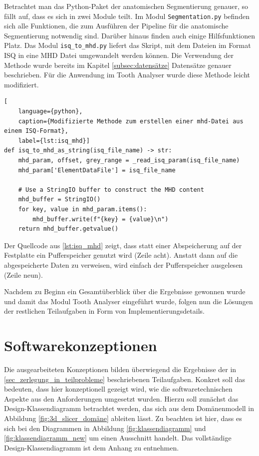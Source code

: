 Betrachtet man das Python-Paket der anatomischen Segmentierung genauer, so fällt
auf, dass es sich in zwei Module teilt. Im Modul \texttt{Segmentation.py}
befinden sich alle Funktionen, die zum Ausführen der Pipeline für die anatomische
Segmentierung notwendig sind. Darüber hinaus finden auch einige Hilfsfunktionen
Platz. Das Modul \texttt{isq\_to\_mhd.py} liefert das Skript, mit dem Dateien im
Format \ac{ISQ} in eine \ac{MHD} Datei umgewandelt werden können. Die Verwendung
der Methode wurde bereits im Kapitel \ref{subsec:datensätze} Datensätze genauer
beschrieben. Für die Anwendung im Tooth Analyser wurde diese Methode leicht modifiziert.

\begin{lstlisting}[
    language={python},
    caption={Modifizierte Methode zum erstellen einer mhd-Datei aus einem ISQ-Format},
    label={lst:isq_mhd}]
def isq_to_mhd_as_string(isq_file_name) -> str:
    mhd_param, offset, grey_range = _read_isq_param(isq_file_name)
    mhd_param['ElementDataFile'] = isq_file_name

    # Use a StringIO buffer to construct the MHD content
    mhd_buffer = StringIO()
    for key, value in mhd_param.items():
        mhd_buffer.write(f"{key} = {value}\n")
    return mhd_buffer.getvalue()
\end{lstlisting}

Der Quellcode aus \ref{lst:isq_mhd} zeigt, dass statt einer Abspeicherung auf der
Festplatte ein Pufferspeicher genutzt wird (Zeile acht). Anstatt dann auf die
abgespeicherte Daten zu verweisen, wird einfach der Pufferspeicher ausgelesen (Zeile
neun).

Nachdem zu Beginn ein Gesamtüberblick über die Ergebnisse gewonnen wurde und damit
das Modul Tooth Analyser eingeführt wurde, folgen nun die Lösungen der
restlichen Teilaufgaben in Form von Implementierungsdetails.

\pagebreak

\section{Softwarekonzeptionen}
\label{sec:konzeptionen} Die ausgearbeiteten Konzeptionen bilden überwiegend die
Ergebnisse der in \ref{sec_zerlegung_in_teilprobleme} beschriebenen Teilaufgaben.
Konkret soll das bedeuten, dass hier konzeptionell gezeigt wird, wie die
softwaretechnischen Aspekte aus den Anforderungen umgesetzt wurden. Hierzu soll zunächst
das Design-Klassendiagramm betrachtet werden, das sich aus dem Domänenmodell in
Abbildung \ref{fig:3d_slicer_domäne} ableiten lässt. Zu beachten ist hier, dass
es sich bei den Diagrammen in Abbildung \ref{fig:klassendiagramm} und
\ref{fig:klassendiagramm_new} um einen Ausschnitt handelt. Das vollständige Design-Klassendiagramm
ist dem Anhang zu entnehmen.

